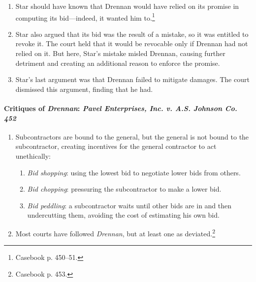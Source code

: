 \begin{enumerate}
\begin{enumerate}
        make a promise binding, even absent bargained-for 
        consideration.\footnote{Casebook p. 450. This case was decided in 
        1958. The ALI published the Restatement in 1932 and Restatement Second 
        in 1979.}
        \item Star should have known that Drennan would have relied on its 
        promise in computing its bid---indeed, it wanted him 
        to.\footnote{Casebook p. 450--51.}
        \item Star also argued that its bid was the result of a mistake, so it 
        was entitled to revoke it. The court held that it would be revocable 
        only if Drennan had not relied on it. But here, Star's mistake misled 
        Drennan, causing further detriment and creating an additional reason 
        to enforce the promise.
        \item Star's last argument was that Drennan failed to mitigate 
        damages. The court dismissed this argument, finding that he had.
    \end{enumerate}
\end{enumerate}

\paragraph{Critiques of \emph{Drennan}: \emph{Pavel Enterprises, Inc. v. A.S. 
Johnson Co. 452}}

\begin{enumerate}
    \item Subcontractors are bound to the general, but the general is not 
    bound to the subcontractor, creating incentives for the general contractor 
    to act unethically:
    \begin{enumerate}
        \item \emph{Bid shopping}: using the lowest bid to negotiate lower 
        bids from others.
        \item \emph{Bid chopping}: pressuring the subcontractor to make a 
        lower bid.
        \item \emph{Bid peddling}: a subcontractor waits until other bids are 
        in and then undercutting them, avoiding the cost of estimating his own 
        bid.
    \end{enumerate}
    \item Most courts have followed \emph{Drennan}, but at least one as 
    deviated.\footnote{Casebook p. 453.}
\end{enumerate}

